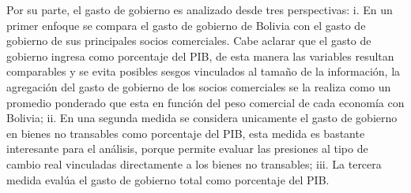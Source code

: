 \documentclass[12pt,letterpaper]{article}
\begin{document}
Por su parte, el gasto de gobierno es analizado desde tres perspectivas: i. En un primer enfoque se compara el gasto de gobierno de Bolivia con el gasto de gobierno de sus principales socios comerciales. Cabe aclarar que el gasto de gobierno ingresa como porcentaje del PIB, de esta manera las variables resultan comparables y se evita posibles sesgos vinculados al tamaño de la información, la agregación del gasto de gobierno de los socios comerciales se la realiza como un promedio ponderado que esta en función del peso comercial de cada economía con Bolivia; ii. En una segunda medida se considera unicamente el gasto de gobierno en bienes no transables como porcentaje del PIB, esta medida es bastante interesante para el análisis, porque permite evaluar las presiones al tipo de cambio real vinculadas directamente a los bienes no transables; iii. La tercera medida evalúa el gasto de gobierno total como porcentaje del PIB. 
\end{document}
